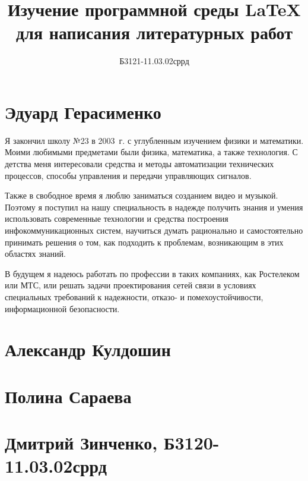 \documentclass[labwork]{fefudoc}
\author{Б3121-11.03.02сррд}{Герасименко Эдуард}
\title{Изучение программной среды \LaTeX{} для написания литературных работ}
\begin{document}
\frontpage
\tableofcontents

\section{Эдуард Герасименко}
Я закончил школу №23 в 2003~г. с углубленным изучением физики и математики. Моими любимыми предметами были физика, математика, а также технология. С детства меня интересовали средства и методы автоматизации технических процессов, способы управления и передачи управляющих сигналов.

Также в свободное время я люблю заниматься созданием видео и музыкой. Поэтому я поступил на нашу специальность в надежде получить знания и умения использовать современные технологии и средства построения инфокоммуникационных систем, научиться думать рационально и самостоятельно принимать решения о том, как подходить к проблемам, возникающим в этих областях знаний.

В будущем я надеюсь работать по профессии в таких компаниях, как Ростелеком или МТС, или решать задачи проектирования сетей связи в условиях специальных требований к надежности, отказо- и помехоустойчивости, информационной безопасности.

\section{Александр Кулдошин}
\section{Полина Сараева}
\section{Дмитрий Зинченко, Б3120-11.03.02сррд}
\end{document}
